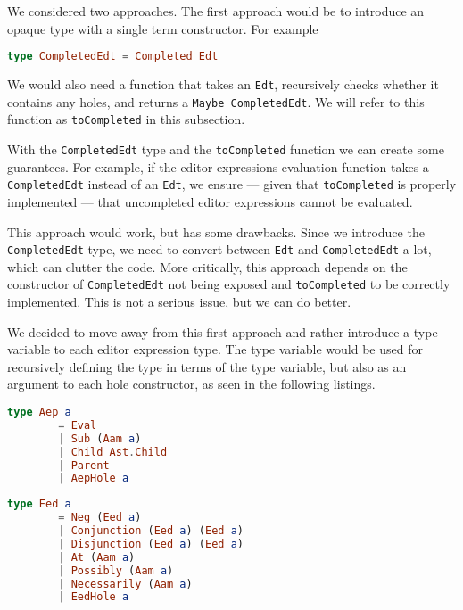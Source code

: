 We considered two approaches. The first approach would be to introduce an
opaque type with a single term constructor. For example

\begin{lstlisting}[language=elm,%
                   label="completed-edt-definition",%
                   gobble=4,%
                   ]
    type CompletedEdt = Completed Edt
\end{lstlisting}

We would also need a function that takes an \texttt{Edt}, recursively
checks whether it contains any holes, and returns a \texttt{Maybe CompletedEdt}.
We will refer to this function as \texttt{toCompleted} in this subsection.

With the \texttt{CompletedEdt} type and the \texttt{toCompleted} function we can
create some guarantees. For example, if the editor expressions evaluation
function takes a \texttt{CompletedEdt} instead of an \texttt{Edt}, we ensure ---
given that \texttt{toCompleted} is properly implemented --- that uncompleted
editor expressions cannot be evaluated.

This approach would work, but has some drawbacks. Since we introduce the
\texttt{CompletedEdt} type, we need to convert between \texttt{Edt} and
\texttt{CompletedEdt} a lot, which can clutter the code. More critically, this
approach depends on the constructor of \texttt{CompletedEdt} not being exposed
and \texttt{toCompleted} to be correctly implemented. This is not a serious
issue, but we can do better.

We decided to move away from this first approach and rather introduce a type
variable to each editor expression type. The type variable would be used
for recursively defining the type in terms of the type variable, but also as an
argument to each hole constructor, as seen in the following listings.

\begin{lstlisting}[language=elm,%
                   label="aep-definition",%
                   gobble=4,%
                   ]
    type Aep a
        = Eval
        | Sub (Aam a)
        | Child Ast.Child
        | Parent
        | AepHole a
\end{lstlisting}

\begin{lstlisting}[language=elm,%
                   label="eed-definitions",%
                   gobble=4,%
                   ]
    type Eed a
        = Neg (Eed a)
        | Conjunction (Eed a) (Eed a)
        | Disjunction (Eed a) (Eed a)
        | At (Aam a)
        | Possibly (Aam a)
        | Necessarily (Aam a)
        | EedHole a
\end{lstlisting}

